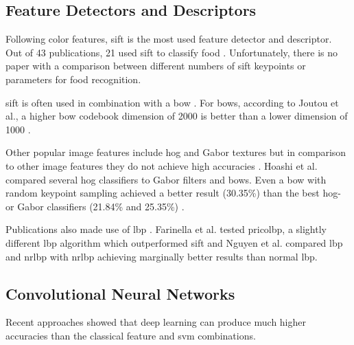 \subsection{Feature Detectors and Descriptors}
Following color features, \gls{sift} \cite{Lowe1999} is the most used feature detector and descriptor. Out of 43 publications, 21 used \gls{sift} to classify food \cite{Kitamura2009, Joutou2009, Wen2009, Chen2009, Kitamura2010, Zong2010, Hoashi2010, Chen2012, Kim2014, Farinella2014, Nguyen2014, Bosch2014, Kagaya2015, Kumar2015, Prabu2015, Beijbom2015, Bettadapura2015, Probst2015}. Unfortunately, there is no paper with a comparison between different numbers of \gls{sift} keypoints or parameters for food recognition.

\gls{sift} is often used in combination with a \gls{bow} \cite{Joutou2009, Chen2009, Kitamura2010, Zong2010, Hoashi2010, Chen2012, Matsuda2012, Kim2014, Nguyen2014, Bosch2014, Kagaya2015, Kumar2015, Beijbom2015, Probst2015}. For \glspl{bow}, according to Joutou et al., a higher \gls{bow} codebook dimension of 2000 is better than a lower dimension of 1000 \cite{Joutou2009}.

Other popular image features include \gls{hog} \cite{Puri2010, Hoashi2010, Matsuda2012, Kim2014, Kawano2014, Kajiwara2015, Beijbom2015} and Gabor textures \cite{Joutou2009, Boushey2010, Hoashi2010, Kim2010, Matsuda2012, Kajiwara2015, Chen2012, Ponrani2014, Bosch2014} but in comparison to other image features they do not achieve high accuracies \cite{Kim2014, Beijbom2015}. Hoashi et al. compared several \gls{hog} classifiers to Gabor filters and \glspl{bow}. Even a \gls{bow} with random keypoint sampling achieved a better result {(30.35\%)} than the best \gls{hog}- or Gabor classifiers {(21.84\% and 25.35\%)} \cite{Hoashi2010}.

Publications also made use of \gls{lbp} \cite{Zong2010, Chen2012, Christodoulidis2015, Prabu2015, Beijbom2015}. Farinella et al. tested \gls{pricolbp}, a slightly different \gls{lbp} algorithm which outperformed \gls{sift} \cite{Farinella2014} and Nguyen et al. compared \gls{lbp} and \gls{nrlbp} with \gls{nrlbp} achieving marginally better results than normal \gls{lbp}. 


\subsection{Convolutional Neural Networks}
Recent approaches showed that deep learning can produce much higher accuracies than the classical feature and \gls{svm} combinations.


